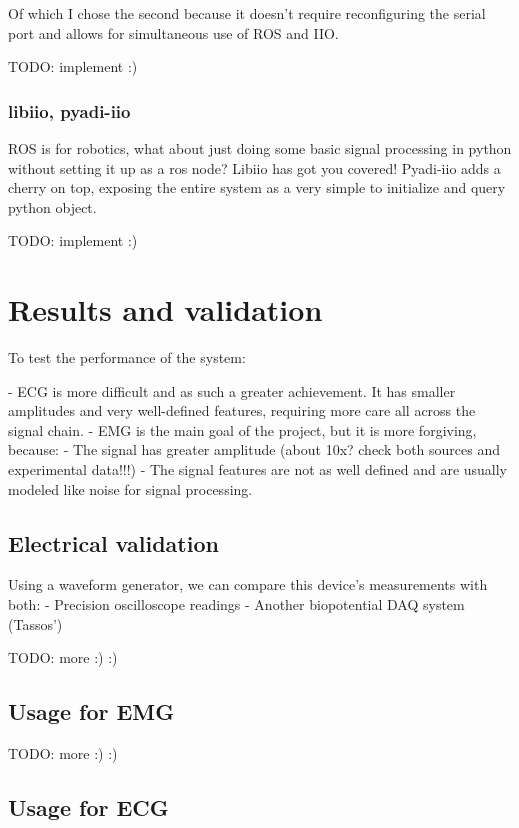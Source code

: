\documentclass{thesis}
\newcommand{\todo}[1]{{\color{red}TODO: #1}}
\begin{document}
{Of which I chose the second because it doesn't require reconfiguring the serial port and allows for simultaneous use of ROS and IIO.

\todo{implement :)}

\subsubsection{libiio, pyadi-iio}

ROS is for robotics, what about just doing some basic signal processing in python without setting it up as a ros node? Libiio has got you covered! Pyadi-iio adds a cherry on top, exposing the entire system as a very simple to initialize and query python object.

\todo{implement :)}

\newpage
\section{Results and validation}

To test the performance of the system:

- ECG is more difficult and as such a greater achievement. It has smaller amplitudes and very well-defined features, requiring more care all across the signal chain. 
- EMG is the main goal of the project, but it is more forgiving, because:
    - The signal has greater amplitude (about 10x? check both sources and experimental data!!!)
    - The signal features are not as well defined and are usually modeled like noise for signal processing.

\subsection{Electrical validation}

Using a waveform generator, we can compare this device's measurements with both:
- Precision oscilloscope readings
- Another biopotential DAQ system (Tassos')

\todo{more :) :)}

\subsection{Usage for EMG}

\todo{more :) :)}

\subsection{Usage for ECG}

}
\end{document}
